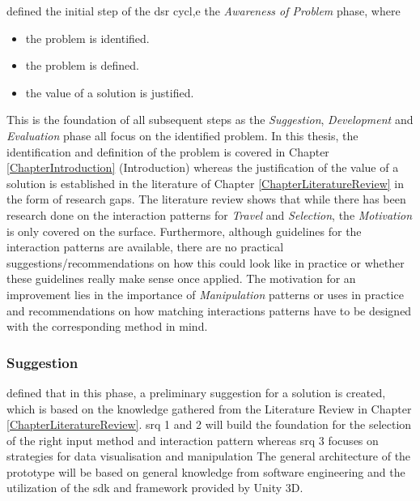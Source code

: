 \cite{Hevner2010} defined the initial step of the \gls{dsr} cycl,e the \textit{Awareness of Problem} phase, where
\begin{itemize}[noitemsep,nolistsep]
	\item the problem is identified.
	\item the problem is defined.
	\item the value of a solution is justified.
\end{itemize}
This is the foundation of all subsequent steps as the \textit{Suggestion}, \textit{Development} and \textit{Evaluation} phase all focus on the identified problem. \newline
In this thesis, the identification and definition of the problem is covered in Chapter \ref{ChapterIntroduction} (Introduction) whereas the justification of the value of a solution is established in the literature of Chapter \ref{ChapterLiteratureReview} in the form of research gaps. The literature review shows that while there has been research done on the interaction patterns for \textit{Travel} and \textit{Selection}, the \textit{Motivation} is only covered on the surface. Furthermore, although guidelines for the interaction patterns are available, there are no practical suggestions/recommendations on how this could look like in practice or whether these guidelines really make sense once applied. The motivation for an improvement lies in the importance of \textit{Manipulation} patterns or uses in practice and recommendations on how matching interactions patterns have to be designed with the corresponding method in mind.



\subsubsection{Suggestion}

\cite{Hevner2010} defined that in this phase, a preliminary suggestion for a solution is created, which is based on the knowledge gathered from the Literature Review in Chapter \ref{ChapterLiteratureReview}. \gls{srq} 1 and 2 will build the foundation for the selection of the right input method and interaction pattern whereas \gls{srq} 3 focuses on strategies for data visualisation and manipulation \newline
The general architecture of the prototype will be based on general knowledge from software engineering and the utilization of the \gls{sdk} and framework provided by Unity 3D.


